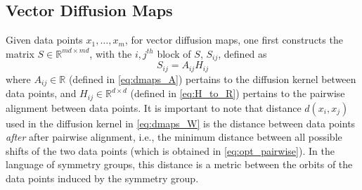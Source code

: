 \documentclass{pnastwo}
\begin{document}
\begin{article}
\begin{materials}
\section{Vector Diffusion Maps \cite{singer2012vector}}

Given data points $x_1, \dots, x_m$, for vector diffusion maps, one first constructs the matrix $S \in \mathbb{R}^{md \times md}$, with the $i,j^{th}$ block of $S$, $S_{ij}$, defined as
\begin{equation} \label{eq:vdm_S}
	S_{ij} = A_{ij} H_{ij}
\end{equation}
%
where $A_{ij} \in \mathbb{R}$ (defined in \eqref{eq:dmaps_A}) pertains to the diffusion kernel between data points, and $H_{ij} \in \mathbb{R}^{d \times d}$ (defined in \eqref{eq:H_to_R}) pertains to the pairwise alignment between data points.
%
It is important to note that distance $d(x_i, x_j)$ used in the diffusion kernel in \eqref{eq:dmaps_W} is the distance between data points {\em after} after pairwise alignment, i.e., the minimum distance between all possible shifts of the two data points (which is obtained in \eqref{eq:opt_pairwise}).
%
In the language of symmetry groups, this distance is a metric between the orbits of the data points induced by the symmetry group.


\end{materials}
\end{article}
\end{document}
